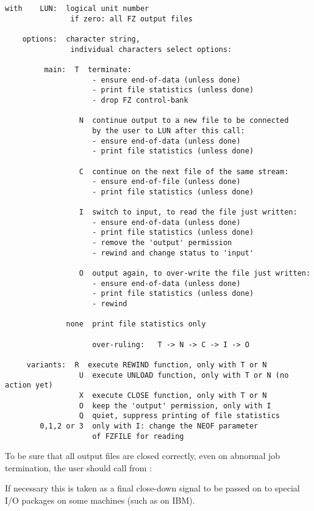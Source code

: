 \begin{verbatim}
with    LUN:  logical unit number
               if zero: all FZ output files

    options:  character string,
               individual characters select options:

         main:  T  terminate:
                    - ensure end-of-data (unless done)
                    - print file statistics (unless done)
                    - drop FZ control-bank

                 N  continue output to a new file to be connected
                    by the user to LUN after this call:
                    - ensure end-of-data (unless done)
                    - print file statistics (unless done)

                 C  continue on the next file of the same stream:
                    - ensure end-of-file (unless done)
                    - print file statistics (unless done)

                 I  switch to input, to read the file just written:
                    - ensure end-of-data (unless done)
                    - print file statistics (unless done)
                    - remove the 'output' permission
                    - rewind and change status to 'input'

                 O  output again, to over-write the file just written:
                    - ensure end-of-data (unless done)
                    - print file statistics (unless done)
                    - rewind

              none  print file statistics only

                    over-ruling:   T -> N -> C -> I -> O

     variants:  R  execute REWIND function, only with T or N
                 U  execute UNLOAD function, only with T or N (no action yet)
                 X  execute CLOSE function, only with T or N
                 O  keep the 'output' permission, only with I
                 Q  quiet, suppress printing of file statistics
        0,1,2 or 3  only with I: change the NEOF parameter
                    of FZFILE for reading
\end{verbatim}
To be sure that all output files are closed correctly,
even on abnormal job termination,
the user should call from : \qquad{}

If necessary this is taken as a final close-down signal
to be passed on to special I/O packages on some machines
(such as  on IBM).

